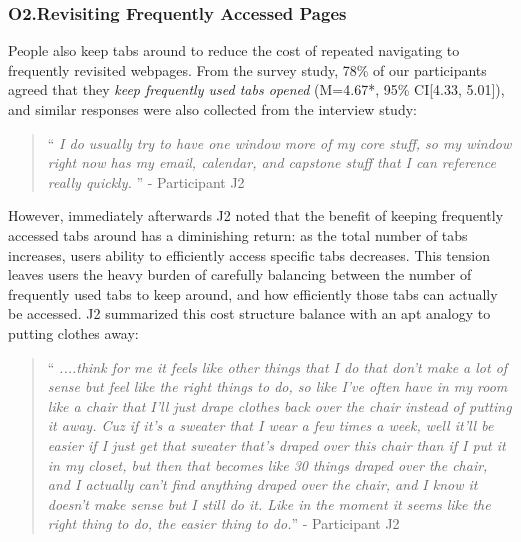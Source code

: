 \subsubsection{O2.Revisiting Frequently Accessed Pages}

People also keep tabs around to reduce the cost of repeated navigating to frequently revisited webpages. From the survey study, 78\% of our participants agreed that they \emph{keep frequently used tabs opened} (M=4.67*, 95\% CI[4.33, 5.01]), and similar responses were also collected from the interview study:


\begin{quote}
``\emph{ I do usually try to have one window more of my core stuff, so my window right now has my email, calendar, and capstone stuff that I can reference really quickly. }'' - Participant J2
\end{quote}

However, immediately afterwards J2 noted that the benefit of keeping frequently accessed tabs around has a diminishing return: as the total number of tabs increases, users ability to efficiently access specific tabs decreases. This tension leaves users the heavy burden of carefully balancing between the number of frequently used tabs to keep around, and how efficiently those tabs can actually be accessed. J2 summarized this cost structure balance with an apt analogy to putting clothes away:

\begin{quote}
``\emph{
....think for me it feels like other things that I do that don't make a lot of sense but feel like the right things to do, so like I've often have in my room like a chair that I'll just drape clothes back over the chair instead of putting it away. Cuz if it's a sweater that I wear a few times a week, well it'll be easier if I just get that sweater that's draped over this chair than if I put it in my closet, but then that becomes like 30 things draped over the chair, and I actually can't find anything draped over the chair, and I know it doesn't make sense but I still do it. Like in the moment it seems like the right thing to do, the easier thing to do.}'' - Participant J2
\end{quote}



